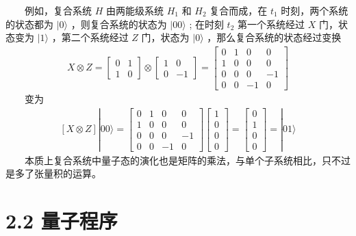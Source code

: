 \documentclass[a4paper,11pt,english]{sphinxmanual}
\begin{document}
\sphinxAtStartPar
  例如，复合系统  \(H\) 由两能级系统  \(H_{1}\) 和  \(H_{2}\) 复合而成，在  \(t_{1}\) 时刻，两个系统的状态都为  \(|0\rangle\) ，则复合系统的状态为  \(|00\rangle\) ; 在时刻  \(t_{2}\) 第一个系统经过 \(X\) 门，状态变为  \(|1\rangle\) ，第二个系统经过  \(Z\) 门，状态为  \(|0\rangle\) ，那么复合系统的状态经过变换
\begin{equation*}
\begin{split}X \otimes Z=\left[\begin{array}{ll} 0 & 1 \\ 1 & 0 \end{array}\right] \otimes\left[\begin{array}{cc} 1 & 0 \\ 0 & -1 \end{array}\right]=\left[\begin{array}{cccc} 0 & 1 & 0 & 0 \\ 1 & 0 & 0 & 0 \\ 0 & 0 & 0 & -1 \\ 0 & 0 & -1 & 0 \end{array}\right]\end{split}
\end{equation*}
\sphinxAtStartPar
  变为
\begin{equation*}
\begin{split}[X \otimes Z]|00\rangle=\left[\begin{array}{cccc} 0 & 1 & 0 & 0 \\ 1 & 0 & 0 & 0 \\ 0 & 0 & 0 & -1 \\ 0 & 0 & -1 & 0 \end{array}\right]\left[\begin{array}{l} 1 \\ 0 \\ 0 \\ 0 \end{array}\right]=\left[\begin{array}{l} 0 \\ 1 \\ 0 \\ 0 \end{array}\right]=|01\rangle\end{split}
\end{equation*}
\sphinxAtStartPar
  本质上复合系统中量子态的演化也是矩阵的乘法，与单个子系统相比，只不过是多了张量积的运算。

\sphinxstepscope


\section{2.2 量子程序}
\label{\detokenize{rst/2.2_u91cf_u5b50_u7a0b_u5e8f:id1}}\label{\detokenize{rst/2.2_u91cf_u5b50_u7a0b_u5e8f::doc}}
\end{document}
